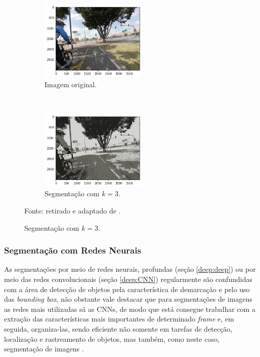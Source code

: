 \begin{figure}[H]
   \caption{Segmentação com K-means.}
   \centering
   \label{segment:fig:5}
    \begin{subfigure}[t]{0.45\textwidth}
        \centering
        \includegraphics[height=1.5in]{recursos/imagens/image_seg/i1.png}
        \caption{Imagem original.}
        \label{segment:fig:5.1}
    \end{subfigure}%
    ~ 
    \begin{subfigure}[t]{0.45\textwidth}
        \centering
        \includegraphics[height=1.5in]{recursos/imagens/image_seg/i2.png}
        \caption{Segmentação com $k = 3$.}
        \label{segment:fig:5.2}
    \end{subfigure}%

    \vspace*{1 cm}
    Fonte: retirado e adaptado de \cite{Neuhold2017_ICCV}.
\end{figure}


\subsubsection{Segmentação com Redes Neurais}
\label{segment:neural}

As segmentações por meio de redes neurais, profundas (seção \ref{deep:deep}) ou por meio das redes convolucionais (seção \ref{deep:CNN}) regularmente são confundidas com a área de detecção de objetos \cite{Ghosh2019} pela característica de demarcação e pelo uso das \textit{bounding box}, não obstante vale destacar que para segmentações de imagens as redes mais utilizadas sã as CNNs, de modo que está consegue trabalhar com a extração das características mais importantes de determinado \textit{frame} e, em seguida, organiza-las, sendo eficiente não somente em tarefas de detecção, localização e rastreamento de objetos, mas também, como neste caso, segmentação de imagens \cite{Ghosh2019}.


